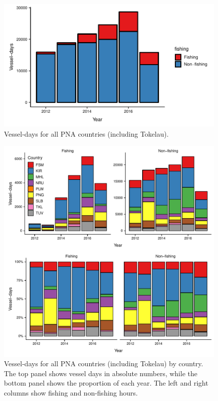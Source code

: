 \documentclass[9pttwoside,lineno]{pnas-new}
\begin{document}
\begin{figure}
\centering
	\includegraphics{img/VDS_year.pdf}
	\caption{\label{fig:VDS_year}Vessel-days for all PNA countries (including Tokelau).}
\end{figure}

\begin{figure}
\centering
	\includegraphics{img/VDS_country_year.pdf}
	\caption{\label{fig:VDS_country_year}Vessel-days for all PNA countries (including Tokelau) by country.
The top panel shows vessel days in absolute numbers, while the bottom panel shows the proportion
of each year. The left and right columns show fishing and non-fishing hours.}
\end{figure}
\end{document}
